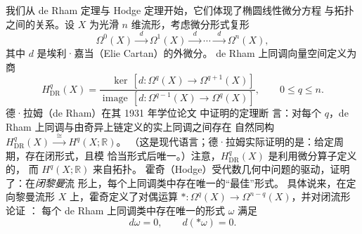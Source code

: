 \documentclass[11pt]{amsart}
\theoremstyle{definition}
\theoremstyle{remark}
\theoremstyle{plain}
\numberwithin{equation}{section}
\renewcommand{\:}{\colon}
\newcommand{\RR}{{\mathbb R}}
\DeclareMathOperator{\image}{image}
\newcommand{\sH}{\mathscr{H}}
\begin{document}
我们从 de Rham 定理与 Hodge 定理开始，它们体现了椭圆线性微分方程
与拓扑之间的关系。设 $X$ 为光滑 $n$ 维流形，考虑微分形式复形
  \begin{equation}\label{eq:25}
     \Omega ^0(X) \xrightarrow{\;\;d\;\;} \Omega ^1(X)
     \xrightarrow{\;\;d\;\;} \cdots \xrightarrow{\;\;d\;\;} \Omega ^n(X),
  \end{equation}
其中 $d$ 是埃利·嘉当（Elie Cartan）的外微分。
de Rham 上同调向量空间定义为商
  \begin{equation}\label{eq:26}
     H^q_{\text{DR}}(X) = \frac{\quad\,\ker \,[d\: \Omega ^q(X) \to \Omega
     ^{q+1}(X)]}{\image \,[d\: \Omega ^{q-1}(X) \to \Omega ^q(X)]},\qquad
     0\le q\le n.
  \end{equation}
德·拉姆（de Rham）在其 1931 年学位论文 \cite{deR} 中证明的定理断
言：对每个 $q$，de Rham 上同调与由奇异上链定义的实上同调之间存在
自然同构
$H^q_{\text{DR}}(X)\xrightarrow{\;\;\cong \;\;} H^q(X;\RR)$。
（这是现代语言；德·拉姆实际证明的是：给定周期，存在闭形式，且模
恰当形式后唯一。）注意，$H^q_{\text{DR}}(X)$ 是利用微分算子定义的，
而 $H^q(X;\RR)$ 来自拓扑。
霍奇（Hodge）受代数几何中问题的驱动，证明了：在{\it 闭黎曼\/}流
形上，每个上同调类中存在唯一的“最佳”形式。
具体说来，在定向黎曼流形 $X$ 上，霍奇定义了对偶运算
$*\: \Omega ^q(X)\to \Omega ^{n-q}(X)$，并对闭流形论证 \cite{Hod}：
每个 de Rham 上同调类中存在唯一的形式 $\omega$ 满足
  \begin{equation}\label{eq:27}
     d\omega =0,\qquad d(*\omega )=0.
  \end{equation}
\end{document}
